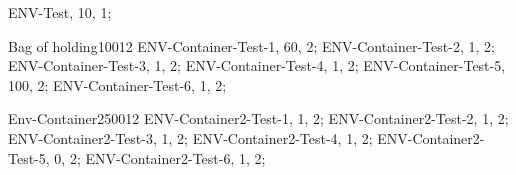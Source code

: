





\begin{Gear}
	ENV-Test, 10, 1;
\end{Gear}

\begin{Container}[weightless = true, symbol = 1]{Bag of holding}{100}{12}
	ENV-Container-Test-1, 60, 2;
	ENV-Container-Test-2, 1, 2;
	ENV-Container-Test-3, 1, 2;
	ENV-Container-Test-4, 1, 2;
	ENV-Container-Test-5, 100, 2;
	ENV-Container-Test-6, 1, 2;
\end{Container}
\begin{Container}[symbol = 2]{Env-Container2}{500}{12}
	ENV-Container2-Test-1, 1, 2;
	ENV-Container2-Test-2, 1, 2;
	ENV-Container2-Test-3, 1, 2;
	ENV-Container2-Test-4, 1, 2;
	ENV-Container2-Test-5, 0, 2;
	ENV-Container2-Test-6, 1, 2;
\end{Container}

